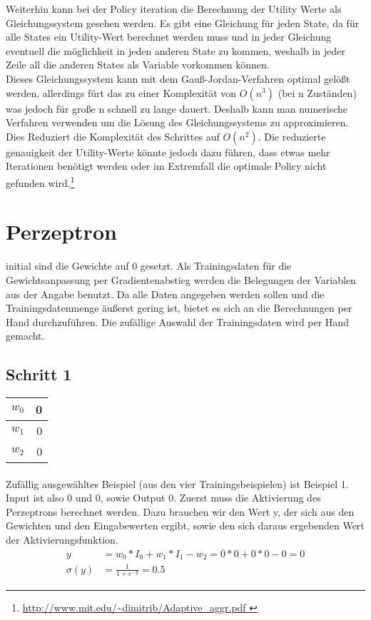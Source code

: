 \documentclass[a4paper]{article}
\begin{document}
Weiterhin kann bei der Policy iteration die Berechnung der Utility Werte als Gleichungssystem gesehen werden. Es gibt eine Gleichung für jeden State, da für alle States ein Utility-Wert berechnet werden muss und in jeder Gleichung eventuell die möglichkeit in jeden anderen State zu kommen, weshalb in jeder Zeile all die anderen States als Variable vorkommen können.\\
Dieses Gleichungssystem kann mit dem Gauß-Jordan-Verfahren optimal gelößt werden, allerdings fürt das zu einer Komplexität von $O(n^3)$ (bei n Zuständen) was jedoch für große n schnell zu lange dauert. Deshalb kann man numerische Verfahren verwenden um die Lösung des Gleichungssystems zu approximieren. Dies Reduziert die Komplexität des Schrittes auf $O(n^2)$. Die reduzierte genauigkeit der Utility-Werte könnte jedoch dazu führen, dass etwas mehr Iterationen benötigt werden oder im Extremfall die optimale Policy nicht gefunden wird.\footnote{\url{ http://www.mit.edu/\~dimitrib/Adaptive_aggr.pdf }}


\section{Perzeptron}
initial sind die Gewichte auf 0 gesetzt. Als Trainingsdaten für die Gewichtsanpassung per Gradientenabstieg werden die Belegungen der Variablen aus der Angabe benutzt. Da alle Daten angegeben werden sollen und die Trainingsdatenmenge äußerst gering ist, bietet es sich an die Berechnungen per Hand durchzuführen. Die zufällige Auswahl der Trainingsdaten wird per Hand gemacht.

\subsection{Schritt 1}
\begin{tabular}{|l|r|}
	\hline
	$w_0$ & 0 \\\hline
	$w_1$ & 0 \\\hline
	$w_2$ & 0 \\\hline
\end{tabular}
\paragraph{}
Zufällig ausgewähltes Beispiel (aus den vier Trainingsbeispielen) ist Beispiel 1. Input ist also 0 und 0, sowie Output 0.
Zuerst muss die Aktivierung des Perzeptrons berechnet werden. Dazu brauchen wir den Wert y, der sich aus den Gewichten und den Eingabewerten ergibt, sowie den sich daraus ergebenden Wert der Aktivierungsfunktion.
\begin{align*}
	y &= w_0 * I_0 + w_1 * I_1 - w_2 = 0 * 0 + 0 * 0 - 0 = 0 \\
	\sigma(y) &= \frac{1}{1 + e^{-y}} = 0.5
\end{align*}
\end{document}
